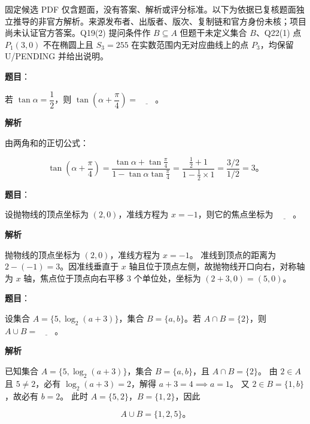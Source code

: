 

\begin{gktip}
固定候选 PDF 仅含题面，没有答案、解析或评分标准。以下为依据已复核题面独立推导的非官方解析。来源发布者、出版者、版次、复制链和官方身份未核；项目尚未认证官方答案。Q19(2) 提问条件作 $B \subseteq A$ 但题干未定义集合 $B$、Q22(1) 点 $P_1(3, 0)$ 不在椭圆上且 $S_3 = 255$ 在实数范围内无对应曲线上的点 $P_3$，均保留 U/PENDING 并给出说明。
\end{gktip}

\begin{answer}

\textbf{题目}：

若 $\tan\alpha = \dfrac{1}{2}$，则 $\tan\left(\alpha + \dfrac{\pi}{4}\right) = \underline{\qquad}$。

\textbf{解析}

由两角和的正切公式：

\nopagebreak[4]
\[
\tan\left(\alpha + \dfrac{\pi}{4}\right) = \dfrac{\tan\alpha + \tan\frac{\pi}{4}}{1 - \tan\alpha \tan\frac{\pi}{4}} = \dfrac{\frac{1}{2} + 1}{1 - \frac{1}{2}\times 1} = \dfrac{3/2}{1/2} = 3\mbox{。}
\]


\end{answer}
\begin{answer}

\textbf{题目}：

设抛物线的顶点坐标为 $(2, 0)$，准线方程为 $x = -1$，则它的焦点坐标为 $\underline{\qquad}$。

\textbf{解析}

抛物线的顶点坐标为 $(2, 0)$，准线方程为 $x = -1$。
准线到顶点的距离为 $2 - (-1) = 3$。因准线垂直于 $x$ 轴且位于顶点左侧，故抛物线开口向右，对称轴为 $x$ 轴，焦点位于顶点向右平移 $3$ 个单位处，坐标为 $(2 + 3, 0) = (5, 0)$。


\end{answer}
\begin{answer}

\textbf{题目}：

设集合 $A = \{5, \log_2(a + 3)\}$，集合 $B = \{a, b\}$。若 $A \cap B = \{2\}$，则 $A \cup B = \underline{\qquad}$。

\textbf{解析}

已知集合 $A = \{5, \log_2(a + 3)\}$，集合 $B = \{a, b\}$，且 $A \cap B = \{2\}$。
由 $2 \in A$ 且 $5 \ne 2$，必有 $\log_2(a + 3) = 2$，解得 $a + 3 = 4 \implies a = 1$。
又 $2 \in B = \{1, b\}$，故必有 $b = 2$。
此时 $A = \{5, 2\}$，$B = \{1, 2\}$，因此

\nopagebreak[4]
\[
A \cup B = \{1, 2, 5\}\mbox{。}
\]


\end{answer}
